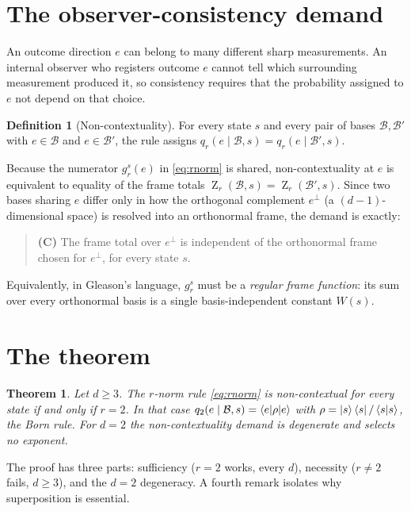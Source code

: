 \documentclass[11pt,a4paper]{article}
\newtheorem{theorem}{Theorem}
\theoremstyle{definition}
\newtheorem{definition}{Definition}
\theoremstyle{remark}
\newcommand{\basis}{\mathcal{B}}
\DeclareMathOperator{\Zframe}{Z}
\begin{document}
\section{The observer-consistency demand}

An outcome direction $e$ can belong to many different sharp measurements. An internal
observer who registers outcome $e$ cannot tell which surrounding measurement produced it, so
consistency requires that the probability assigned to $e$ not depend on that choice.

\begin{definition}[Non-contextuality]
For every state $s$ and every pair of bases $\basis,\basis'$ with $e\in\basis$ and
$e\in\basis'$, the rule assigns $q_r(e\mid\basis,s)=q_r(e\mid\basis',s)$.
\end{definition}

Because the numerator $g_r^{s}(e)$ in \eqref{eq:rnorm} is shared, non-contextuality at $e$
is equivalent to equality of the frame totals $\Zframe_r(\basis,s)=\Zframe_r(\basis',s)$.
Since two bases sharing $e$ differ only in how the orthogonal complement $e^{\perp}$ (a
$(d-1)$-dimensional space) is resolved into an orthonormal frame, the demand is exactly:
\begin{quote}
\textbf{(C)}\; The frame total over $e^{\perp}$ is independent of the orthonormal frame
chosen for $e^{\perp}$, for every state $s$.
\end{quote}
Equivalently, in Gleason's language, $g_r^{s}$ must be a \emph{regular frame function}: its
sum over every orthonormal basis is a single basis-independent constant $W(s)$.

\section{The theorem}

\begin{theorem}\label{thm:main}
Let $d\ge 3$. The $r$-norm rule \eqref{eq:rnorm} is non-contextual for every state if and
only if $r=2$. In that case
$q_2(e\mid\basis,s)=\braket{e|\rho|e}$ with $\rho=\ket{s}\bra{s}/\braket{s|s}$, the Born
rule. For $d=2$ the non-contextuality demand is degenerate and selects no exponent.
\end{theorem}

The proof has three parts: sufficiency ($r=2$ works, every $d$), necessity ($r\neq 2$ fails,
$d\ge 3$), and the $d=2$ degeneracy. A fourth remark isolates why superposition is essential.
\end{document}

